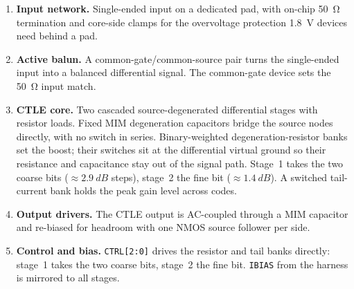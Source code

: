 \documentclass[11pt,a4paper]{article}
\newcommand{\pin}[1]{\texttt{#1}}
\begin{document}
\begin{enumerate}
\item \textbf{Input network.} Single-ended input on a dedicated pad, with
  on-chip \SI{50}{\ohm} termination and core-side clamps for the overvoltage
  protection \SI{1.8}{V} devices need behind a pad.
\item \textbf{Active balun.} A common-gate/common-source pair turns the
  single-ended input into a balanced differential signal. The common-gate
  device sets the \SI{50}{\ohm} input match.
\item \textbf{CTLE core.} Two cascaded source-degenerated differential
  stages with resistor loads. Fixed MIM degeneration capacitors bridge the
  source nodes directly, with no switch in series. Binary-weighted
  degeneration-resistor banks set the boost; their switches sit at the
  differential virtual ground so their resistance and capacitance stay out
  of the signal path. Stage~1 takes the two coarse bits
  ($\approx\SI{2.9}{dB}$ steps), stage~2 the fine bit
  ($\approx\SI{1.4}{dB}$). A switched tail-current bank holds the peak gain
  level across codes.
\item \textbf{Output drivers.} The CTLE output is AC-coupled through a MIM
  capacitor and re-biased for headroom with one NMOS source follower per side.
\item \textbf{Control and bias.} \pin{CTRL[2:0]} drives the resistor and
  tail banks directly: stage~1 takes the two coarse bits, stage~2 the
  fine bit. \pin{IBIAS} from the harness is
  mirrored to all stages.
\end{enumerate}
\end{document}
